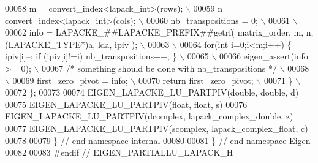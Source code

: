 \begin{DoxyCode}
00058 \textcolor{preprocessor}{    m = convert\_index<lapack\_int>(rows); \(\backslash\)}
00059 \textcolor{preprocessor}{    n = convert\_index<lapack\_int>(cols); \(\backslash\)}
00060 \textcolor{preprocessor}{    nb\_transpositions = 0; \(\backslash\)}
00061 \textcolor{preprocessor}{\(\backslash\)}
00062 \textcolor{preprocessor}{    info = LAPACKE\_##LAPACKE\_PREFIX##getrf( matrix\_order, m, n, (LAPACKE\_TYPE*)a, lda, ipiv ); \(\backslash\)}
00063 \textcolor{preprocessor}{\(\backslash\)}
00064 \textcolor{preprocessor}{    for(int i=0;i<m;i++) \{ ipiv[i]--; if (ipiv[i]!=i) nb\_transpositions++; \} \(\backslash\)}
00065 \textcolor{preprocessor}{\(\backslash\)}
00066 \textcolor{preprocessor}{    eigen\_assert(info >= 0); \(\backslash\)}
00067 \textcolor{preprocessor}{}\textcolor{comment}{/* something should be done with nb\_transpositions */}\textcolor{preprocessor}{ \(\backslash\)}
00068 \textcolor{preprocessor}{\(\backslash\)}
00069 \textcolor{preprocessor}{    first\_zero\_pivot = info; \(\backslash\)}
00070 \textcolor{preprocessor}{    return first\_zero\_pivot; \(\backslash\)}
00071 \textcolor{preprocessor}{  \} \(\backslash\)}
00072 \textcolor{preprocessor}{\};}
00073 
00074 EIGEN\_LAPACKE\_LU\_PARTPIV(\textcolor{keywordtype}{double}, \textcolor{keywordtype}{double}, d)
00075 EIGEN\_LAPACKE\_LU\_PARTPIV(\textcolor{keywordtype}{float}, \textcolor{keywordtype}{float}, s)
00076 EIGEN\_LAPACKE\_LU\_PARTPIV(dcomplex, lapack\_complex\_double, z)
00077 EIGEN\_LAPACKE\_LU\_PARTPIV(scomplex, lapack\_complex\_float,  c)
00078 
00079 \} \textcolor{comment}{// end namespace internal}
00080 
00081 \} \textcolor{comment}{// end namespace Eigen}
00082 
00083 \textcolor{preprocessor}{#endif // EIGEN\_PARTIALLU\_LAPACK\_H}
\end{DoxyCode}
